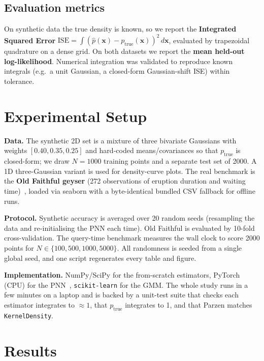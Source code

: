 \documentclass[11pt,a4paper]{article}
\begin{document}
\subsection{Evaluation metrics}
On synthetic data the true density is known, so we report the
\textbf{Integrated Squared Error}
$\mathrm{ISE}=\int (\hat p(\mathbf{x})-p_{\text{true}}(\mathbf{x}))^2\,
d\mathbf{x}$, evaluated by trapezoidal quadrature on a dense grid. On both
datasets we report the \textbf{mean held-out log-likelihood}. Numerical
integration was validated to reproduce known integrals (e.g.\ a unit Gaussian,
a closed-form Gaussian-shift ISE) within tolerance.

\section{Experimental Setup}
\textbf{Data.} The synthetic 2D set is a mixture of three bivariate Gaussians
with weights $[0.40,0.35,0.25]$ and hard-coded means/covariances so that
$p_{\text{true}}$ is closed-form; we draw $N=1000$ training points and a
separate test set of 2000. A 1D three-Gaussian variant is used for density-curve
plots. The real benchmark is the \textbf{Old Faithful geyser} (272 observations
of eruption duration and waiting time)~\cite{azzalini1990}, loaded via seaborn
with a byte-identical bundled CSV fallback for offline runs.

\textbf{Protocol.} Synthetic accuracy is averaged over 20 random seeds
(resampling the data and re-initialising the PNN each time). Old Faithful is
evaluated by 10-fold cross-validation. The query-time benchmark measures the wall
clock to score 2000 points for $N\in\{100,500,1000,5000\}$. All randomness is
seeded from a single global seed, and one script regenerates every table and
figure.

\textbf{Implementation.} NumPy/SciPy for the from-scratch estimators, PyTorch
(CPU) for the PNN~\cite{paszke2019}, \texttt{scikit-learn} for the GMM. The whole
study runs in a few minutes on a laptop and is backed by a unit-test suite that
checks each estimator integrates to $\approx 1$, that $p_{\text{true}}$ integrates
to 1, and that Parzen matches \texttt{KernelDensity}.

\section{Results}
\end{document}
